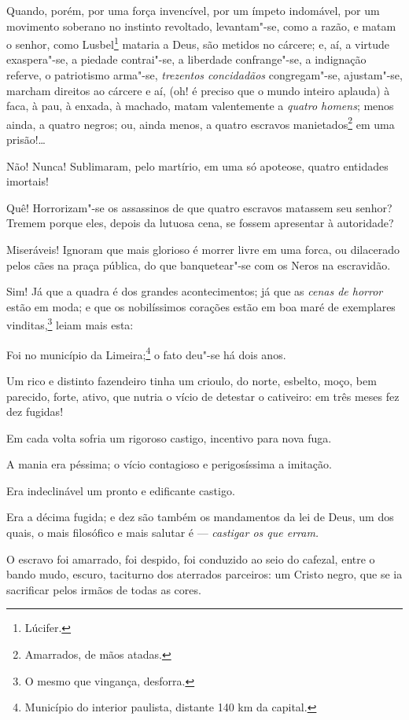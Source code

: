 Quando, porém, por uma força invencível, por um ímpeto indomável, por um
movimento soberano no instinto revoltado, levantam"-se, como a razão, e
matam o senhor, como Lusbel\footnote{Lúcifer.} mataria a Deus, são
metidos no cárcere; e, aí, a virtude exaspera"-se, a piedade contrai"-se,
a liberdade confrange"-se, a indignação referve, o patriotismo arma"-se,
\emph{trezentos concidadãos} congregam"-se, ajustam"-se, marcham direitos
ao cárcere e aí, (oh! é preciso que o mundo inteiro aplauda) à faca, à
pau, à enxada, à machado, matam valentemente a \emph{quatro homens};
menos ainda, a quatro negros; ou, ainda menos, a quatro escravos
manietados\footnote{Amarrados, de mãos atadas.} em uma prisão!\ldots{}

Não! Nunca! Sublimaram, pelo martírio, em uma só apoteose, quatro
entidades imortais!

Quê! Horrorizam"-se os assassinos de que quatro escravos matassem seu
senhor? Tremem porque eles, depois da lutuosa cena, se fossem apresentar
à autoridade?

Miseráveis! Ignoram que mais glorioso é morrer livre em uma forca, ou
dilacerado pelos cães na praça pública, do que banquetear"-se com os
Neros na escravidão.

Sim! Já que a quadra é dos grandes acontecimentos; já que as \emph{cenas
de horror} estão em moda; e que os nobilíssimos corações estão em boa
maré de exemplares vinditas,\footnote{O mesmo que vingança, desforra.}
leiam mais esta:

Foi no município da Limeira;\footnote{Município do interior paulista,
  distante 140 km da capital.} o fato deu"-se há dois anos.

Um rico e distinto fazendeiro tinha um crioulo, do norte, esbelto, moço,
bem parecido, forte, ativo, que nutria o vício de detestar o cativeiro:
em três meses fez dez fugidas!

Em cada volta sofria um rigoroso castigo, incentivo para nova fuga.

A mania era péssima; o vício contagioso e perigosíssima a imitação.

Era indeclinável um pronto e edificante castigo.

Era a décima fugida; e dez são também os mandamentos da lei de Deus, um
dos quais, o mais filosófico e mais salutar é --- \emph{castigar os que
erram.}

O escravo foi amarrado, foi despido, foi conduzido ao seio do cafezal,
entre o bando mudo, escuro, taciturno dos aterrados parceiros: um Cristo
negro, que se ia sacrificar pelos irmãos de todas as cores.


